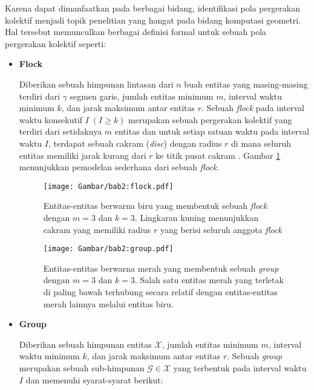 Karena dapat dimanfaatkan pada berbagai bidang, identifikasi pola pergerakan kolektif menjadi topik penelitian yang hangat pada bidang komputasi geometri. Hal tersebut memunculkan berbagai definisi formal untuk sebuah pola pergerakan kolektif seperti:

\begin{itemize}
    \item \textbf{Flock}
    
    Diberikan sebuah himpunan lintasan dari $n$ buah entitas yang masing-masing terdiri dari $\gamma$ segmen garis, jumlah entitas minimum $m$, interval waktu minimum $k$, dan jarak maksimum antar entitas $r$. Sebuah \textit{flock} pada interval waktu konsekutif $I\;(I \geq k)$ merupakan sebuah pergerakan kolektif yang terdiri dari setidaknya $m$ entitas dan untuk setiap satuan waktu pada interval waktu $I$, terdapat sebuah cakram (\textit{disc}) dengan radius $r$ di mana seluruh entitas memiliki jarak kurang dari $r$ ke titik pusat cakram \cite{gudmundsson:flock}. Gambar \ref{bab2:flock} menunjukkan pemodelan sederhana dari sebuah \textit{flock}.
    
    \begin{figure}[h]
        \centering
        \texttt{[image: Gambar/bab2:flock.pdf]}
        \caption[Sebuah \textit{flock}]{Entitas-entitas berwarna biru yang membentuk sebuah \textit{flock} dengan $m = 3$ dan $k = 3$. Lingkaran kuning menunjukkan cakram yang memiliki radius $r$ yang berisi seluruh anggota \textit{flock}}
        \label{bab2:flock}
    \end{figure}
    
    \begin{figure}[t]
        \centering
        \texttt{[image: Gambar/bab2:group.pdf]}
        \caption[Sebuah \textit{group}]{Entitas-entitas berwarna merah yang membentuk sebuah \textit{group} dengan $m = 3$ dan $k = 3$. Salah satu entitas merah yang terletak di paling bawah terhubung secara relatif dengan entitas-entitas merah lainnya melalui entitas biru.}
        \label{bab2:group}
    \end{figure}
    
    \item \textbf{Group}
    
    Diberikan sebuah himpunan entitas $\mathcal{X}$, jumlah entitas minimum $m$, interval waktu minimum $k$, dan jarak maksimum antar entitas $r$. Sebuah \textit{group} merupakan sebuah sub-himpunan $\mathcal{G} \in \mathcal{X}$ yang terbentuk pada interval waktu $I$ dan memenuhi syarat-syarat berikut:
    

\end{itemize}
